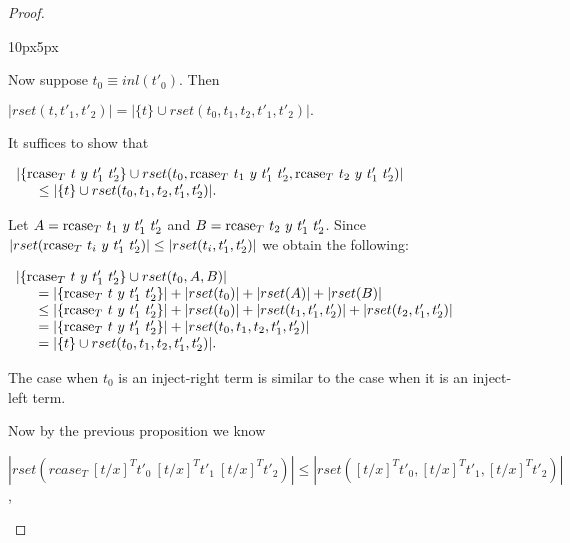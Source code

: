 \begin{proof}
\begin{changemargin}{10px}{5px}
\begin{itemize}
\begin{itemize}
    Now suppose $t_0 \equiv inl(t'_0)$.  Then
    \begin{center}
      \begin{math}
        |rset(t, t'_1, t'_2)| = |\{t\} \cup rset(t_0, t_1, t_2, t'_1, t'_2)|.
      \end{math}
    \end{center}
    It suffices to show that 
    \begin{center}
      \begin{math}
        \begin{array}{lll}
          |\{\mbox{rcase}_{T}\ t\ y\ t'_1\ t'_2\} \cup
          rset(t_0,\mbox{rcase}_{T}\ t_1\ y\ t'_1\ t'_2,\mbox{rcase}_{T}\ t_2\ y\ t'_1\ t'_2)|\\
          \text{\ \ \ \ } \leq |\{t\} \cup rset(t_0, t_1, t_2, t'_1, t'_2)|.
        \end{array}
      \end{math}
    \end{center}
    Let $A = \mbox{rcase}_{T}\ t_1\ y\ t'_1\ t'_2$ and $B = \mbox{rcase}_{T}\ t_2\ y\ t'_1\ t'_2$. Since \\
    $|rset(\mbox{rcase}_{T}\ t_i\ y\ t'_1\ t'_2)| \leq |rset(t_i,t'_1,t'_2)|$ we obtain the following:
    \begin{center}
      \begin{math}
        \begin{array}{lll}
          |\{\mbox{rcase}_{T}\ t\ y\ t'_1\ t'_2\} \cup rset(t_0,A,B)|\\
          \text{\ \ \ \ } = |\{\mbox{rcase}_{T}\ t\ y\ t'_1\ t'_2\}| + |rset(t_0)| + |rset(A)| + |rset(B)|\\
          \text{\ \ \ \ } \leq |\{\mbox{rcase}_{T}\ t\ y\ t'_1\ t'_2\}| +
          |rset(t_0)| + |rset(t_1,t'_1,t'_2)| + |rset(t_2,t'_1,t'_2)|\\
          \text{\ \ \ \ } = |\{\mbox{rcase}_{T}\ t\ y\ t'_1\ t'_2\}| + |rset(t_0, t_1,t_2,t'_1,t'_2)|\\
          \text{\ \ \ \ } = |\{t\} \cup rset(t_0, t_1, t_2, t'_1, t'_2)|.\\
        \end{array}
      \end{math}
    \end{center}
    The case when $t_0$ is an inject-right term is similar to the case when it is an inject-left term.
  \end{itemize}
  Now by the previous proposition we know 
  \begin{center}
    $|rset(rcase_T\ [t/x]^T t'_0\ [t/x]^T t'_1\ [t/x]^T t'_2)| \leq |rset([t/x]^T t'_0, [t/x]^T t'_1, [t/x]^T t'_2)|$,

\end{center}
\end{itemize}
\end{changemargin}
\end{proof}
